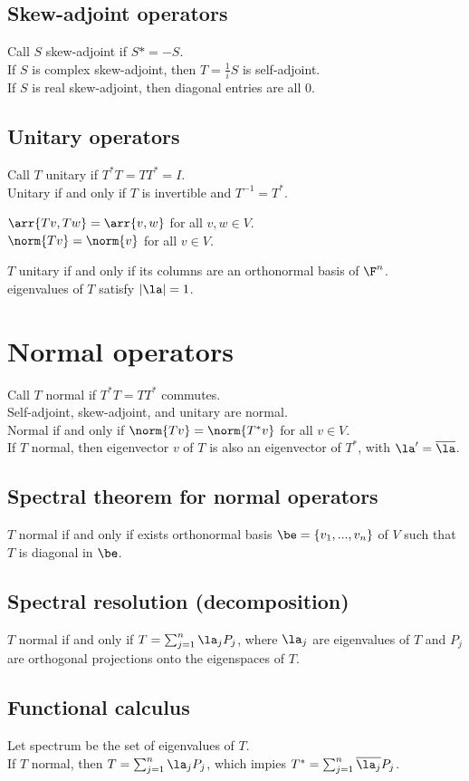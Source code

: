 \documentclass[10pt]{LatexTemplate/hw}
\begin{document}
\begin{multicols*}{2}
\subsection{Skew-adjoint operators}
Call $S$ skew-adjoint if $S*=-S$.\\
If $S$ is complex skew-adjoint, then $T=\frac1iS$ is self-adjoint.\\
If $S$ is real skew-adjoint, then diagonal entries are all $0$.

\subsection{Unitary operators}
Call $T$ unitary if $T^*T=TT^*=I$.\\
Unitary if and only if $T$ is invertible and $T^{-1}=T^*$.

$\arr{Tv,Tw}=\arr{v,w}$ for all $v,w\in V$.\\
$\norm{Tv}=\norm{v}$ for all $v\in V$.

$T$ unitary if and only if its columns are an orthonormal basis of $\F^n$.\\
eigenvalues of $T$ satisfy $|\la|=1$.

\section{Normal operators}
Call $T$ normal if $T^*T=TT^*$ commutes.\\
Self-adjoint, skew-adjoint, and unitary are normal.\\
Normal if and only if $\norm{Tv}=\norm{T^*v}$ for all $v\in V$.\\
If $T$ normal, then eigenvector $v$ of $T$ is also an eigenvector of $T^*$, with $\la'=\overline{\la}$.
\subsection{Spectral theorem for normal operators}
$T$ normal if and only if exists orthonormal basis $\be=\{v_1,...,v_n\}$ of $V$ such that $T$ is diagonal in $\be$.
\subsection{Spectral resolution (decomposition)}
$T$ normal if and only if $T=\sum_{j=1}^n\la_jP_j$, where $\la_j$ are eigenvalues of $T$ and $P_j$ are orthogonal projections onto the eigenspaces of $T$.

\subsection{Functional calculus}
Let spectrum be the set of eigenvalues of $T$.\\
If $T$ normal, then $T=\sum_{j=1}^n\la_jP_j$, which impies $T^*=\sum_{j=1}^n\overline{\la_j}P_j$.


\end{multicols*}
\end{document}
